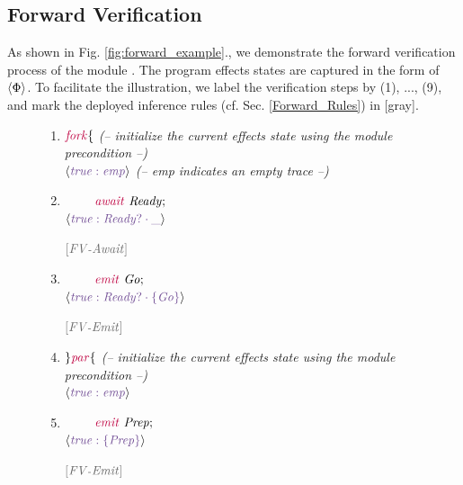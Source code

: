 \documentclass[acmsmall,10pt,review]{acmart}
\newcommand{\key}[1]{\textcolor{purple}{\code{#1}}}
\newcommand{\siderule}[1]{
\code{\footnotesize{\textcolor{mGray}{#1}}}}
\newcommand{\effect}{\textcolor{black}{\ensuremath{\mathrm{\Phi}}}}
\newcommand{\code}[1]{{\tt{\ensuremath{\m{#1}}}}}
\newcommand{\m}{\mathit}
\newcommand\figref[1]{Fig. \textcolor{black}{\ref{#1}}.}
\newcommand\secref[1]{Sec. \textcolor{black}{\ref{#1}}}
\begin{document}
      \vspace{-2mm}
\subsection{Forward Verification}
As shown in \figref{fig:forward_example}, we demonstrate the forward verification process of the module  {}. The program effects states  are captured in the form of \code{\langle \textcolor{huntergreen}{\effect} \rangle}. To facilitate the illustration, we label the verification steps by (1), ..., (9), and mark the deployed inference rules (cf. \secref{Forward_Rules}) in \textcolor{mGray}{[gray]}.

{
\begin{figure}[ht]
      \vspace{0mm}
     \begin{minipage}[c]{\columnwidth}
      \vspace{0mm}
         \centering
         {\small
\begin{enumerate}
  \item  \code{\key{fork}\{    } 
                 \textcolor{mGray}{  \emph{(– initialize the current effects state using the module precondition –)}}
  \\
 \code{\langle  \textcolor{darklavender}{true : emp} \rangle }
                  \textcolor{mGray}{  \emph{(– emp indicates an empty trace –)}}
  \item    \code{~\qquad \key{await}\ Ready;}
   \\
 \code{\langle  \textcolor{darklavender}{true : Ready? \cdot\_ } \rangle }
     \siderule{ [FV\text{-}Await]}
     \\
   \item    \code{~\qquad \key{emit}\ Go;}
         \\
 \code{\langle  \textcolor{darklavender}{true : Ready? \cdot\{Go\}} \rangle }
     \siderule{ [FV\text{-}Emit]}
     \\
  \item \code{ \} \key{par}\{ }
       \textcolor{mGray}{  \emph{(– initialize the current effects state using the module precondition –)}}
  \\
 \code{\langle  \textcolor{darklavender}{true : emp} \rangle }
  \item    \code{~\qquad \key{emit}\ Prep; }
     \\
 \code{\langle  \textcolor{darklavender}{true : \{Prep\}} \rangle }
     \siderule{ [FV\text{-}Emit]}
     \\

\end{enumerate}}
\end{minipage}
\end{figure}}
\end{document}
